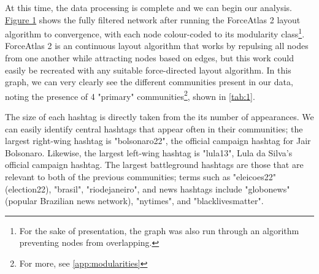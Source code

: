 \documentclass[a4paper,11pt]{article}  %
\begin{document}
	At this time, the data processing is complete and we can begin our analysis. \hyperref[fig:1]{Figure 1} shows the fully filtered network after running the ForceAtlas 2 layout algorithm to convergence, with each node colour-coded to its modularity class\footnote{For the sake of presentation, the graph was also run through an algorithm preventing nodes from overlapping.}. ForceAtlas 2 is an continuous layout algorithm that works by repulsing all nodes from one another while attracting nodes based on edges\parencite{jacomyForceAtlas2ContinuousGraph2014}, but this work could easily be recreated with any suitable force-directed layout algorithm. In this graph, we can very clearly see the different communities present in our data, noting the presence of 4 "primary" communities\footnote{For more, see \autoref{app:modularities}}, shown in \autoref{tab:1}.

	The size of each hashtag is directly taken from the its number of appearances. We can easily identify central hashtags that appear often in their communities; the largest right-wing hashtag is "bolsonaro22", the official campaign hashtag for Jair Bolsonaro. Likewise, the largest left-wing hashtag is "lula13", Lula da Silva's official campaign hashtag. The largest battleground hashtags are those that are relevant to both of the previous communities; terms such as "eleicoes22" (election22), "brasil", "riodejaneiro", and news hashtags include "globonews" (popular Brazilian news network), "nytimes", and "blacklivesmatter".
\end{document}
